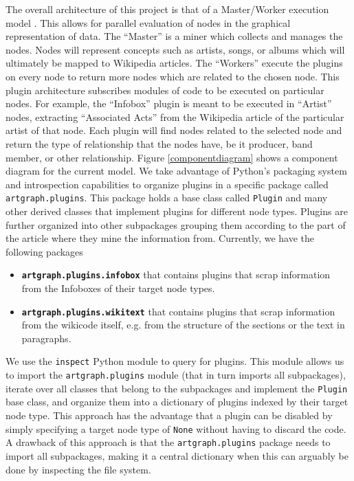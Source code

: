 \documentclass{sig-alternate}
\begin{document}
The overall architecture of this project is that of a Master/Worker execution model \cite{Garg:2001:TOA:558986}.
This allows for parallel evaluation of nodes in the graphical representation of data. 
The ``Master'' is a miner which collects and manages the nodes. Nodes will represent 
concepts such as artists, songs, or albums which will ultimately be mapped to Wikipedia 
articles. The ``Workers'' execute the plugins on every node to return more nodes which are 
related to the chosen node. This plugin architecture subscribes modules of code to be 
executed on particular nodes. For example, the ``Infobox'' plugin is meant to be executed 
in ``Artist'' nodes, extracting ``Associated Acts'' from the Wikipedia article of the particular 
artist of that node. Each plugin will find nodes related to the selected node and return 
the type of relationship that the nodes have, be it producer, band member, or other relationship. Figure
\ref{componentdiagram} shows a component diagram for the current model. We take advantage of Python's packaging system
and introspection capabilities to organize plugins in a specific package called {\tt artgraph.plugins}. This package
holds a base class called {\tt Plugin} and many other derived classes that implement plugins for different node
types. Plugins are further organized into other subpackages grouping them according to the part of the article where they
mine the information from. Currently, we have the following packages

\begin{itemize}
\item \textbf{\tt artgraph.plugins.infobox} that contains plugins that scrap information from the Infoboxes of their target
  node types.
\item \textbf{\tt artgraph.plugins.wikitext} that contains plugins that scrap information from the wikicode itself,
  e.g. from the structure of the sections or the text in paragraphs.
\end{itemize}

We use the {\tt inspect} Python module to query for plugins. This module allows us to import the {\tt artgraph.plugins}
module (that in turn imports all subpackages), iterate over all classes that  belong to the subpackages and implement
the {\tt Plugin} base  class, and organize them into a dictionary of plugins indexed by their target node type. This
approach has the advantage that a plugin can be disabled by simply specifying a target node type of {\tt None} without
having to discard the code. A drawback of this approach is that the {\tt artgraph.plugins} package needs to import all
subpackages, making it a central dictionary when this can arguably be done by inspecting the file system.
\end{document}
